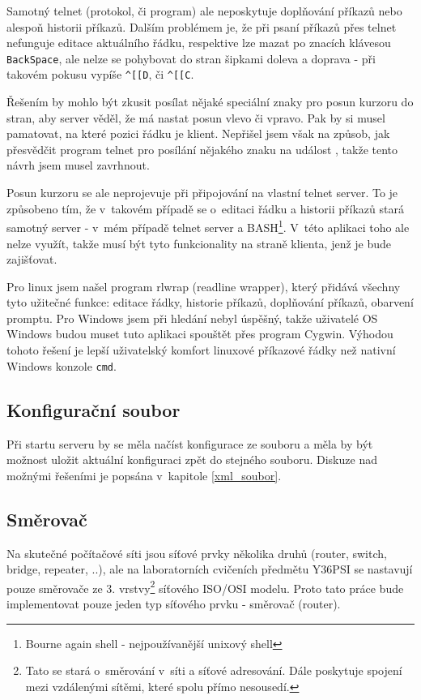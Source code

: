 Samotný telnet (protokol, či program) ale neposkytuje doplňování příkazů nebo alespoň historii příkazů. Dalším problémem je, že při psaní příkazů přes telnet nefunguje editace aktuálního řádku, respektive lze mazat po znacích klávesou \verb|BackSpace|, ale nelze se pohybovat do stran šipkami doleva a doprava - při takovém pokusu vypíše \verb|^[[D|, či \verb|^[[C|. 

Řešením by mohlo být zkusit posílat nějaké speciální znaky pro posun kurzoru do stran, aby server věděl, že má nastat posun vlevo či vpravo. Pak by si musel  pamatovat, na které pozici řádku je klient. Nepřišel jsem však na způsob, jak přesvědčit program telnet pro posílání nějakého znaku na událost , takže tento návrh jsem musel zavrhnout.

Posun kurzoru se ale neprojevuje při připojování na vlastní telnet server. To je způsobeno tím, že v~takovém případě se o~editaci řádku a historii příkazů stará samotný server - v~mém případě telnet server a BASH\footnote{Bourne again shell - nejpoužívanější unixový shell}. V~této aplikaci toho ale nelze využít, takže musí být tyto funkcionality na straně klienta, jenž je bude zajišťovat. 

Pro linux jsem našel program rlwrap (readline wrapper), který přidává všechny tyto užitečné funkce: editace řádky, historie příkazů, doplňování příkazů, obarvení promptu. Pro Windows jsem při hledání nebyl úspěšný, takže uživatelé OS Windows budou muset tuto aplikaci spouštět přes program Cygwin. Výhodou tohoto řešení je lepší uživatelský komfort linuxové příkazové řádky než nativní Windows konzole \verb|cmd|.


\subsection{Konfigurační soubor}
Při startu serveru by se měla načíst konfigurace ze souboru a měla by být možnost uložit aktuální konfiguraci zpět do stejného souboru. Diskuze nad možnými řešeními je popsána v~kapitole \ref{xml_soubor}.


\subsection{Směrovač}
Na skutečné počítačové síti jsou síťové prvky několika druhů (router, switch, bridge, repeater, ..), ale na laboratorních cvičeních předmětu Y36PSI se  nastavují pouze směrovače ze 3. vrstvy\footnote{Tato  se stará o~směrování v~síti a síťové adresování. Dále poskytuje spojení mezi vzdálenými sítěmi, které spolu přímo nesousedí.} síťového ISO/OSI modelu. Proto tato práce bude implementovat pouze jeden typ síťového prvku - směrovač (router). 

